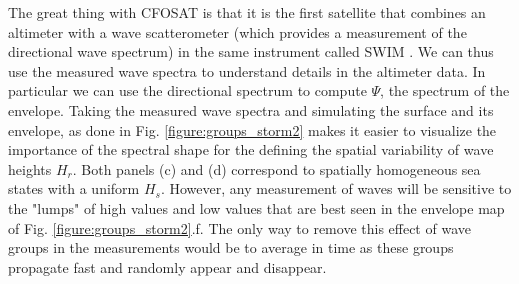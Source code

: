 {The great thing with CFOSAT is that it is the first satellite that combines an altimeter with a wave scatterometer (which provides a measurement of the directional wave spectrum) in the same instrument called SWIM \citep{Hauser&al.2021}. We can thus use the measured wave spectra to understand details in the altimeter data.  In particular we can use the directional spectrum to compute $\Psi$, the spectrum of the envelope. %
Taking the measured wave spectra and simulating the surface and its envelope, as done in Fig. \ref{figure:groups_storm2} makes it easier to visualize the importance of the spectral shape for the defining the spatial variability of wave heights $H_r$. Both panels (c) and (d) correspond to spatially homogeneous sea states with a uniform $H_s$. However, any measurement of waves will be sensitive to the "lumps" of high values and low values that are best seen in the envelope map of Fig. \ref{figure:groups_storm2}.f. The only way to remove this effect of wave groups in the measurements would be to average in time as these groups propagate fast and randomly appear and disappear. 

}
